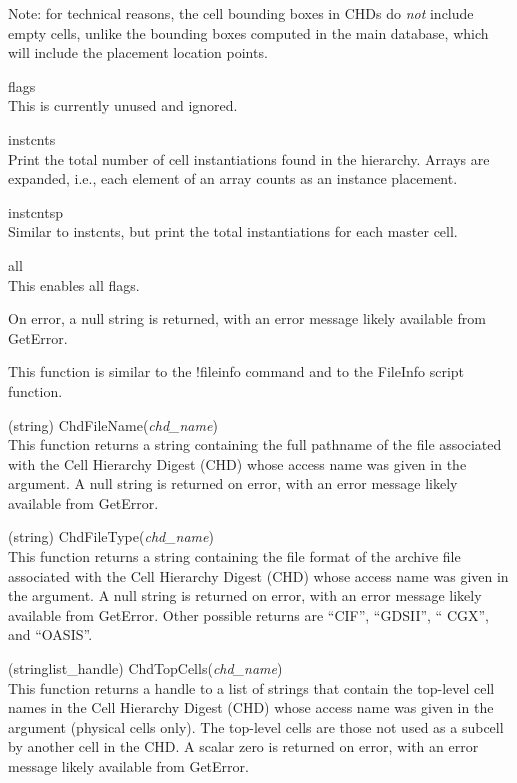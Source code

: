 \begin{description}
\begin{description}
Note:  for technical reasons, the cell bounding boxes in CHDs do
{\it not} include empty cells, unlike the bounding boxes computed
in the main database, which will include the placement location
points.

\item{\vt flags}\\
This is currently unused and ignored.

\item{\vt instcnts}\\
Print the total number of cell instantiations found in the hierarchy. 
Arrays are expanded, i.e., each element of an array counts as an
instance placement.

\item{\vt instcntsp}\\
Similar to {\vt instcnts}, but print the total instantiations for
each master cell.

\item{\vt all}\\
This enables all flags.
\end{description}

On error, a null string is returned, with an error message likely
available from {\vt GetError}.

This function is similar to the {\cb !fileinfo} command and to the
{\vt FileInfo} script function.

\item{(string) \vt ChdFileName({\it chd\_name\/})}\\
This function returns a string containing the full pathname of the
file associated with the Cell Hierarchy Digest (CHD) whose access name
was given in the argument.  A null string is returned on error, with
an error message likely available from {\vt GetError}.

\item{(string) \vt ChdFileType({\it chd\_name\/})}\\
This function returns a string containing the file format of the
archive file associated with the Cell Hierarchy Digest (CHD) whose
access name was given in the argument.  A null string is returned on
error, with an error message likely available from {\vt GetError}. 
Other possible returns are ``{\vt CIF}'', ``{\vt GDSII}'', ``{\vt
CGX}'', and ``{\vt OASIS}''.

\item{(stringlist\_handle) \vt ChdTopCells({\it chd\_name\/})}\\
This function returns a handle to a list of strings that contain the
top-level cell names in the Cell Hierarchy Digest (CHD) whose access
name was given in the argument (physical cells only).  The top-level
cells are those not used as a subcell by another cell in the CHD.  A
scalar zero is returned on error, with an error message likely
available from {\vt GetError}.


\end{description}
